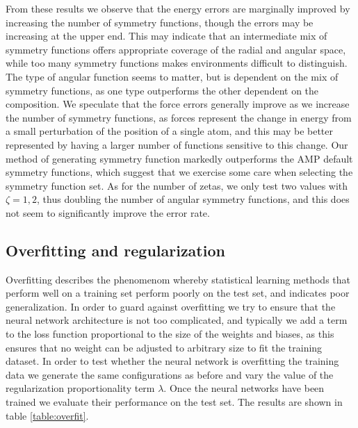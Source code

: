 From these results we observe that the energy errors are marginally
improved by increasing the number of symmetry functions, though the
errors may be increasing at the upper end. This may indicate
that an intermediate mix of symmetry functions offers appropriate
coverage of the radial and angular space, while too many symmetry
functions makes environments difficult to distinguish.
The type of angular function seems to matter, but is dependent
on the mix of symmetry functions, as one type outperforms the other
dependent on the composition.
We speculate that the force errors generally improve as we increase
the number of symmetry functions, as forces represent the change in energy
from a small perturbation of the position of a single atom,
and this may be better represented by having a larger number of functions
sensitive to this change.
Our method of generating symmetry function markedly outperforms
the AMP default symmetry functions, which suggest that we exercise
some care when selecting the symmetry function set.
As for the number of zetas, we only test two values with
$\zeta = 1, 2$, thus doubling the number of angular symmetry functions,
and this does not seem to significantly improve the error rate.

\subsection{Overfitting and regularization}
Overfitting describes the phenomenom whereby statistical learning methods
that perform well on a training set perform poorly on the test set,
and indicates poor generalization.
In order to guard against overfitting we try to ensure that the
neural network architecture is not too complicated, and typically
we add a term to the loss function proportional
to the size of the weights and biases,
as this ensures that no weight can be adjusted to arbitrary size
to fit the training dataset.
In order to test whether the neural network is overfitting the training
data we generate the same configurations as before and vary
the value of the regularization proportionality term $\lambda$.
Once the neural networks have been trained we evaluate their
performance on the test set. The results are shown in table \ref{table:overfit}.

